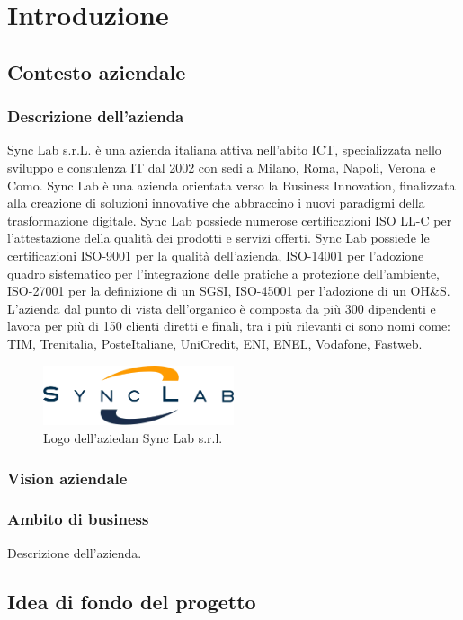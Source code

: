 \chapter{Introduzione}
\label{cap:introduzione}
\section{Contesto aziendale}
\subsection{Descrizione dell'azienda}
Sync Lab s.r.L. è una azienda italiana attiva nell'abito ICT, specializzata nello sviluppo e consulenza IT dal 2002 con sedi a 
Milano, Roma, Napoli, Verona e Como.  Sync Lab è una azienda orientata verso la Business Innovation, finalizzata alla 
creazione di soluzioni innovative che abbraccino i nuovi paradigmi della trasformazione digitale.
Sync Lab possiede numerose certificazioni ISO LL-C per l'attestazione della 
qualità dei prodotti e servizi offerti. Sync Lab possiede le certificazioni 
ISO-9001 per la qualità dell'azienda, ISO-14001 per l'adozione quadro sistematico per l'integrazione delle pratiche a protezione dell'ambiente, ISO-27001 per la definizione di un SGSI, ISO-45001 per l'adozione di un OH\&S.
\\
L'azienda dal punto di vista dell'organico è composta da più 300 dipendenti e lavora per più di 150 clienti diretti e finali, tra i più rilevanti ci sono nomi come: TIM, Trenitalia, PosteItaliane, UniCredit, ENI, ENEL, Vodafone, Fastweb.
\begin{figure}[htbp]
    \centering
    \includegraphics[width=0.5\textwidth]{images/introduzione/logo_azienda.png}
    \caption{Logo dell'aziedan Sync Lab s.r.l.}
\end{figure}
\subsection{Vision aziendale}
\subsection{Ambito di business}
Descrizione dell'azienda.

\section{Idea di fondo del progetto}

